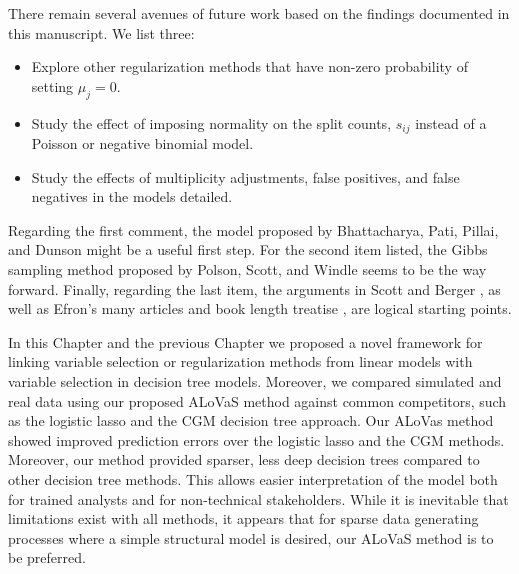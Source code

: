 There remain several avenues of future work based on the findings documented in this manuscript. We list three:

\begin{itemize}
\item Explore other regularization methods that have non-zero probability of setting $\mu_j=0$. 
\item Study the effect of imposing normality on the split counts, $s_{ij}$ instead of a Poisson or negative binomial model. 
\item Study the effects of multiplicity adjustments, false positives, and false negatives in the models detailed. 
\end{itemize}

Regarding the first comment, the model proposed by Bhattacharya, Pati, Pillai, and Dunson \cite{bhattacharya2012bayesian} might be a useful first step. For the second item listed, the Gibbs sampling method proposed by Polson, Scott, and Windle \cite{polson2013bayesian} seems to be the way forward. Finally, regarding the last item, the arguments in Scott and Berger \cite{scott2010bayes}, as well as Efron's many articles and book length treatise \cite{efron2009empirical,efron2004large,efron2007correlation,efron2010large}, are logical starting points. 

In this Chapter and the previous Chapter we proposed a novel framework for linking variable selection or regularization methods from linear models with variable selection in decision tree models. Moreover, we compared simulated and real data using our proposed ALoVaS method against common competitors, such as the logistic lasso and the CGM decision tree approach. Our ALoVas method showed improved prediction errors over the logistic lasso and the CGM methods. Moreover, our method provided sparser, less deep decision trees compared to other decision tree methods. This allows easier interpretation of the model both for trained analysts and for non-technical stakeholders. While it is inevitable that limitations exist with all methods, it appears that for sparse data generating processes where a simple structural model is desired, our ALoVaS method is to be preferred.  
